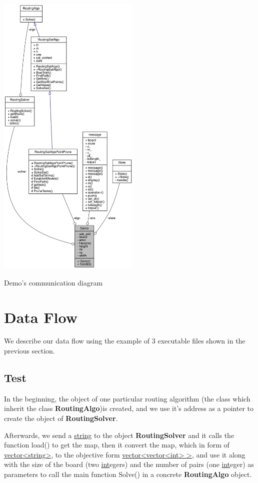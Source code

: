 \documentclass[twocolumn]{article}
\begin{document}
\begin{center}
\makeatletter
\def\@captype{figure}
\makeatother
\includegraphics [height=14cm]{UMLDemo}
\caption{Demo's communication diagram}
\label{UMLDemo}
\end{center}

\section{Data Flow}

We describe our data flow using the example of 3 executable files shown in the previous section.

\subsection{Test}

In the beginning, the object of one particular routing algorithm (the class which inherit the class \textbf{RoutingAlgo})is created, and we use it's address as a pointer to create the object of \textbf{RoutingSolver}.

Afterwards, we send a \underline{string} to the object \textbf{RoutingSolver} and it calls the function load() to get the map, then it convert the map, which in form of \underline{vector<string>}, to the objective form \underline{vector<vector<int> >}, and use it along with the size of the board (two \underline{int}egers) and the number of pairs (one \underline{int}eger) as parameters to call the main function Solve() in a concrete \textbf{RoutingAlgo} object.
\end{document}
